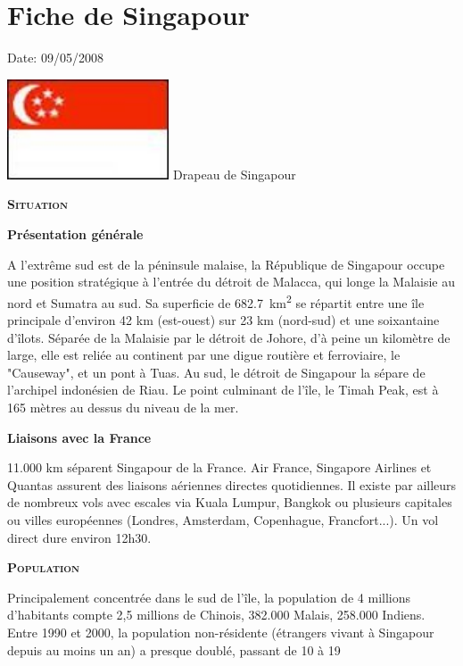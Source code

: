 \section{Fiche de Singapour}

Date: 09/05/2008

\begin{multicols}{2}

\hspace*{-0.65cm}
\includegraphics[width=4.8cm]{articles/Fiche-de-singapour/1210328633arj0.jpg}
Drapeau de Singapour


\textbf{\textsc{Situation}}

\textbf{Présentation générale}

A l'extrême sud est de la péninsule malaise, la République de Singapour occupe une position stratégique à l'entrée du détroit de Malacca, qui longe la Malaisie au nord et Sumatra au sud. Sa superficie de \SI{682.7}{km^2} se répartit entre une île principale d'environ 42 km (est-ouest) sur 23 km (nord-sud) et une soixantaine d'îlots. Séparée de la Malaisie par le détroit de Johore, d'à peine un kilomètre de large, elle est reliée au continent par une digue routière et ferroviaire, le "Causeway", et un pont à Tuas. Au sud, le détroit de Singapour la sépare de l'archipel indonésien de Riau. Le point culminant de l'île, le Timah Peak, est à 165 mètres au dessus du niveau de la mer.

\textbf{Liaisons avec la France}

11.000 km séparent Singapour de la France. Air France, Singapore Airlines et Quantas assurent des liaisons aériennes directes quotidiennes. Il existe par ailleurs de nombreux vols avec escales via Kuala Lumpur, Bangkok ou plusieurs capitales ou villes européennes (Londres, Amsterdam, Copenhague, Francfort...). Un vol direct dure environ 12h30.

\textbf{\textsc{Population}}

Principalement concentrée dans le sud de l'île, la population de 4 millions d'habitants compte 2,5 millions de Chinois, 382.000 Malais, 258.000 Indiens. Entre 1990 et 2000, la population non-résidente (étrangers vivant à Singapour depuis au moins un an) a presque doublé, passant de 10 à 19%


\end{multicols}
